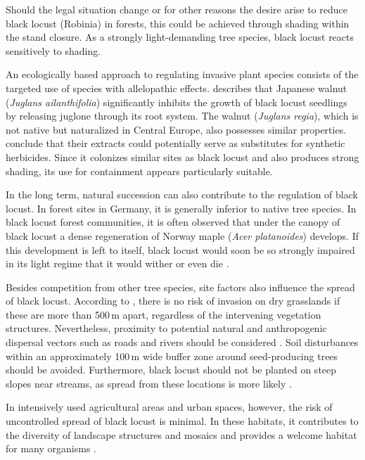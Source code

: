 Should the legal situation change or for other reasons the desire arise to reduce black locust (Robinia) in forests, this could be achieved through shading within the stand closure. As a strongly light-demanding tree species, black locust reacts sensitively to shading.

An ecologically based approach to regulating invasive plant species consists of the targeted use of species with allelopathic effects. \citet{jung2010robinie} describes that Japanese walnut (\emph{Juglans ailanthifolia}) significantly inhibits the growth of black locust seedlings by releasing juglone through its root system. The walnut (\emph{Juglans regia}), which is not native but naturalized in Central Europe, also possesses similar properties. \citet{dordevic2022nussAllelopathi} conclude that their extracts could potentially serve as substitutes for synthetic herbicides. Since it colonizes similar sites as black locust and also produces strong shading, its use for containment appears particularly suitable.

In the long term, natural succession can also contribute to the regulation of black locust. In forest sites in Germany, it is generally inferior to native tree species. In black locust forest communities, it is often observed that under the canopy of black locust a dense regeneration of Norway maple (\emph{Acer platanoides}) develops. If this development is left to itself, black locust would soon be so strongly impaired in its light regime that it would wither or even die \citep{kohler1963robinie}.

Besides competition from other tree species, site factors also influence the spread of black locust. According to \citet[p.~134]{landeck2022robinie}, there is no risk of invasion on dry grasslands if these are more than 500\,m apart, regardless of the intervening vegetation structures. Nevertheless, proximity to potential natural and anthropogenic dispersal vectors such as roads and rivers should be considered \citep{skowronek2020robinieNaturschutz}. Soil disturbances within an approximately 100\,m wide buffer zone around seed-producing trees should be avoided. Furthermore, black locust should not be planted on steep slopes near streams, as spread from these locations is more likely \citep{morimoto2009robinie}.

In intensively used agricultural areas and urban spaces, however, the risk of uncontrolled spread of black locust is minimal. In these habitats, it contributes to the diversity of landscape structures and mosaics and provides a welcome habitat for many organisms \citep{vitkova2018robinie}.

